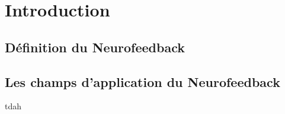 \chapter{Introduction}


\section{Définition du Neurofeedback}

\section{Les champs d'application du Neurofeedback}

\gls{tdah}